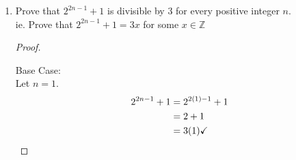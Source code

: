 \documentclass[11 pt]{article}
\theoremstyle{definition}
\theoremstyle{definition}
\def\ZZ{\mathbb{Z}}
\begin{document}
\begin{enumerate}
\begin{enumerate}
        \begin{proof}

            \

            Base Case:\\
            Let $n=1$. \\
            \begin{align} \setcounter{equation}{0}
                \sum\limits_{i=1}^1 f_{i}^2 &= f_i^2\\
                                          &= 1^2\\
                                          &= 1 \times 1\\
                                          &= f_1 f_2 \checkmark
            \end{align}%

            Inductive Step: \\
            Let P($n$) be the statement $\sum\limits_{i=1}^n f_i^2 = f_n f_{n+1}$\\
            Assume P($n$) (We will show P($n+1$)).
            \begin{align}
                &\sum\limits_{i=1}^n f_{i}^2 = f_nf_{n+1}\\
                \implies &\sum\limits_{i=1}^n f_i^2 + f_{n+1}^2 = f_nf_{n+1}+f_{n+1}^2\\
                \implies &\sum\limits_{i=1}^{n+1} f_i^2 = f_{n+1}(f_n+f_{n+1})\\
                \implies &\sum\limits_{i=1}^{n+1} f_i^2 = f_{n+1}f_{n+2}\\
                \implies & P(n+1) \text{ is true.}
            \end{align}
            Therefore $\sum\limits_{i=1}^n f_i^2 = f_nf_{n+1}$ for all $n \in \ZZ^+$
        \end{proof}
	\end{enumerate}
\pagebreak%
\item Prove that $2^{2n-1} + 1$ is divisible by 3 for every positive integer $n$.\\
        ie. Prove that $2^{2n-1} + 1 = 3x$ for some $x \in \ZZ$ 
        \begin{proof}

            \

            Base Case:\\
            Let $n=1$. \\
            \begin{align} \setcounter{equation}{0}
                2^{2n-1}+1 &= 2^{2(1)-1}+1\\
                           &= 2+1\\
                           &= 3(1) \checkmark
            \end{align}%


\end{proof}
\end{enumerate}
\end{document}
